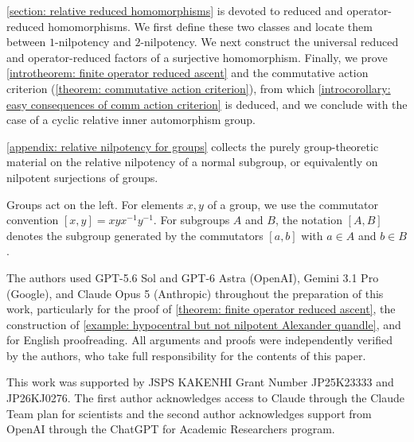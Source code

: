 \begin{Out}
\cref{section: relative reduced homomorphisms} is devoted to reduced and operator-reduced homomorphisms. We first define these two classes and locate them between $1$-nilpotency and $2$-nilpotency.
We next construct the universal reduced and operator-reduced factors of a surjective homomorphism. 
Finally, we prove \cref{introtheorem: finite operator reduced ascent} and the commutative action criterion (\cref{theorem: commutative action criterion}), from which \cref{introcorollary: easy consequences of comm action criterion} is deduced, and we conclude with the case of a cyclic relative inner automorphism group.
 
\cref{appendix: relative nilpotency for groups} collects the purely group-theoretic material on the relative nilpotency of a normal subgroup, or equivalently on nilpotent surjections of groups.
\end{Out}





\begin{NoCon}
Groups act on the left. For elements $x,y$ of a group, we use the commutator convention $[x,y]=xyx^{-1}y^{-1}$. For subgroups $A$ and $B$, the notation $[A,B]$ denotes the subgroup generated by the commutators $[a,b]$ with $a\in A$ and $b\in B$.
\end{NoCon}

\begin{AI}
The authors used GPT-5.6 Sol and GPT-6 Astra (OpenAI), Gemini 3.1 Pro (Google), and Claude Opus 5 (Anthropic) throughout the preparation of this work, particularly for the proof of \cref{theorem: finite operator reduced ascent}, the construction of \cref{example: hypocentral but not nilpotent Alexander quandle}, and for English proofreading. 
All arguments and proofs were independently verified by the authors, who take full responsibility for the contents of this paper.
\end{AI}

\begin{Ack}
This work was supported by JSPS KAKENHI Grant Number JP25K23333 and JP26KJ0276.
The first author acknowledges access to Claude through the Claude Team plan for scientists and the second author acknowledges support from OpenAI through the ChatGPT for Academic Researchers program.
\end{Ack}
